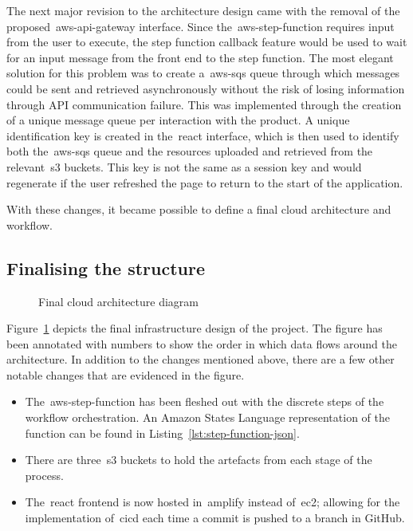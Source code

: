 The next major revision to the architecture design came with the removal of the proposed~\gls{aws-api-gateway} interface.
Since the~\gls{aws-step-function} requires input from the user to execute,
the step function callback feature would be used to wait for an input message from the front end to the step function.
The most elegant solution for this problem was
to create a~\gls{aws-sqs} queue through which messages could be sent
and retrieved asynchronously without the risk of losing information through API communication failure.
This was implemented through the creation of a unique message queue per interaction with the product.
A unique identification key is created in the~\gls{react} interface, which is then used
to identify both the~\gls{aws-sqs} queue and the resources uploaded and retrieved from the relevant~\gls{s3} buckets.
This key is not the same as a session key
and would regenerate if the user refreshed the page to return to the start of the application.

With these changes, it became possible to define a final cloud architecture and workflow.

\subsection{Finalising the structure}\label{subsec:finalising-the-structure}

\begin{figure}[!htb]
    \minipage{\textwidth}
    
    \caption{Final cloud architecture diagram}\label{fig:final_design}
    \endminipage\hfill
\end{figure}

Figure~\ref{fig:final_design} depicts the final infrastructure design of the project.
The figure has been annotated with numbers to show the order in which data flows around the architecture.
In addition to the changes mentioned above, there are a few other notable changes that are evidenced in the figure.

\begin{itemize}
    \item The~\gls{aws-step-function} has been fleshed out with the discrete steps of the workflow orchestration.
    An Amazon States Language representation of the function can be found in Listing~\ref{lst:step-function-json}.
    \item There are three~\gls{s3} buckets to hold the artefacts from each stage of the process.
    \item The~\gls{react} frontend is now hosted in~\gls{amplify} instead of~\gls{ec2};
    allowing for the implementation of~\gls{cicd} each time a commit is pushed to a branch in GitHub.
\end{itemize}

